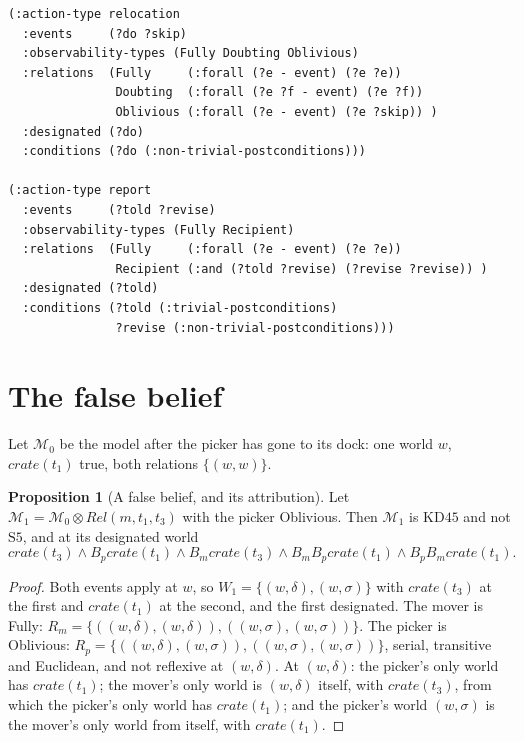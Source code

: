 \documentclass[11pt,a4paper]{article}
\theoremstyle{definition}
\newtheorem{proposition}{Proposition}
\newcommand{\Mod}{\mathcal{M}}
\newcommand{\prd}{\otimes}
\newcommand{\Bop}[1]{B_{#1}}
\newcommand{\code}[1]{\texttt{\small #1}}
\newcommand{\ag}[1]{\mathit{#1}}
\newcommand{\pk}{\ag{p}}
\newcommand{\mv}{\ag{m}}
\newcommand{\crate}{\mathit{crate}}
\begin{document}
\begin{lstlisting}[caption={The two action types, in \code{epddl/beliefs.epddl}.}, label={lst:beliefs}]
(:action-type relocation
  :events     (?do ?skip)
  :observability-types (Fully Doubting Oblivious)
  :relations  (Fully     (:forall (?e - event) (?e ?e))
               Doubting  (:forall (?e ?f - event) (?e ?f))
               Oblivious (:forall (?e - event) (?e ?skip)) )
  :designated (?do)
  :conditions (?do (:non-trivial-postconditions)))

(:action-type report
  :events     (?told ?revise)
  :observability-types (Fully Recipient)
  :relations  (Fully     (:forall (?e - event) (?e ?e))
               Recipient (:and (?told ?revise) (?revise ?revise)) )
  :designated (?told)
  :conditions (?told (:trivial-postconditions)
               ?revise (:non-trivial-postconditions)))
\end{lstlisting}

\section{The false belief}
\label{sec:false}

Let $\Mod_0$ be the model after the picker has gone to its dock: one world $w$,
$\crate(t_1)$ true, both relations $\{(w,w)\}$.

\begin{proposition}[A false belief, and its attribution]
\label{prop:false}
Let $\Mod_1 = \Mod_0 \prd \mathit{Rel}(\mv, t_1, t_3)$ with the picker Oblivious.
Then $\Mod_1$ is $\mathrm{KD45}$ and not $\mathrm{S5}$, and at its designated world
\[
  \crate(t_3) \wedge \Bop{\pk}\crate(t_1) \wedge \Bop{\mv}\crate(t_3)
  \wedge \Bop{\mv}\Bop{\pk}\crate(t_1) \wedge \Bop{\pk}\Bop{\mv}\crate(t_1).
\]
\end{proposition}

\begin{proof}
Both events apply at $w$, so $W_1 = \{(w,\delta), (w,\sigma)\}$ with
$\crate(t_3)$ at the first and $\crate(t_1)$ at the second, and the first
designated. The mover is Fully: $R_\mv = \{((w,\delta),(w,\delta)),
((w,\sigma),(w,\sigma))\}$. The picker is Oblivious:
$R_\pk = \{((w,\delta),(w,\sigma)), ((w,\sigma),(w,\sigma))\}$, serial,
transitive and Euclidean, and not reflexive at $(w,\delta)$. At $(w,\delta)$:
the picker's only world has $\crate(t_1)$; the mover's only world is
$(w,\delta)$ itself, with $\crate(t_3)$, from which the picker's only world has
$\crate(t_1)$; and the picker's world $(w,\sigma)$ is the mover's only world
from itself, with $\crate(t_1)$.
\end{proof}
\end{document}
